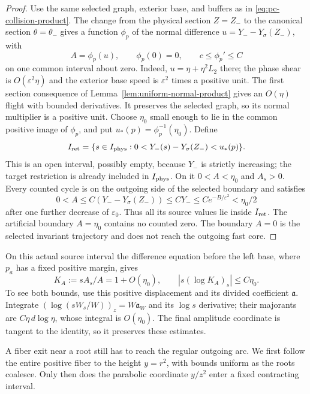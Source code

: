 \begin{proof}
Use the same selected graph, exterior base, and buffers as in
\eqref{eq:pc-collision-product}. The change from the physical section
$Z=Z_-$ to the canonical section $\theta=\theta_-$ gives a function
$\phi_p$ of the normal difference $u=Y_--Y_\sigma(Z_-)$, with
\[
 A=\phi_p(u),\qquad \phi_p(0)=0,\qquad c\le\phi_p'\le C
\]
on one common interval about zero. Indeed, $u=\eta+\eta^2L_2$ there;
the phase shear is $O(\varepsilon^2\eta)$ and the exterior base speed
is $\varepsilon^2$ times a positive unit. The first section consequence
of Lemma~\ref{lem:uniform-normal-product} gives an $O(\eta)$ flight
with bounded derivatives. It preserves the selected graph, so its normal
multiplier is a positive unit. Choose $\eta_0$ small enough to lie in
the common positive image of $\phi_p$, and put
$u_*(p)=\phi_p^{-1}(\eta_0)$. Define
\begin{equation}
\label{eq:pc-localized-source}
 I_{\rm ret}=\{s\in I_{\rm phys}:
       0<Y_-(s)-Y_\sigma(Z_-)<u_*(p)\}.
\end{equation}
This is an open interval, possibly empty, because $Y_-$ is strictly
increasing; the target restriction is already included in $I_{\rm phys}$.
On it $0<A<\eta_0$ and $A_s>0$. Every counted cycle is on the outgoing
side of the selected boundary and satisfies
\[
 0<A\le C(Y_--Y_\sigma(Z_-))\le CY_-
       \le Ce^{-B/\varepsilon^2}<\eta_0/2
\]
after one further decrease of $\varepsilon_0$. Thus all its source
values lie inside $I_{\rm ret}$. The artificial boundary $A=\eta_0$
contains no counted zero. The boundary $A=0$ is the selected invariant
trajectory and does not reach the outgoing fast core.
\end{proof}

On this actual source interval the difference equation before the left
base, where $p_a$ has a fixed positive margin, gives
\begin{equation}
\label{eq:pc-left-elasticity}
 K_A:=sA_s/A=1+O(\eta_0),\qquad
 |s(\log K_A)_s|\le C\eta_0.
\end{equation}
To see both bounds, use this positive displacement and its divided
coefficient $\mathfrak a$. Integrate
$(\log(sW_s/W))_z=W\mathfrak a_W$ and its $\log s$ derivative; their
majorants are $C\eta\,d\log\eta$, whose integral is $O(\eta_0)$.
The final amplitude coordinate is tangent to the identity, so it
preserves these estimates.

A fiber exit near a root still has to reach the regular outgoing arc.
We first follow the entire positive fiber to the height $y=r^2$, with
bounds uniform as the roots coalesce. Only then does the parabolic
coordinate $y/z^2$ enter a fixed contracting interval.

